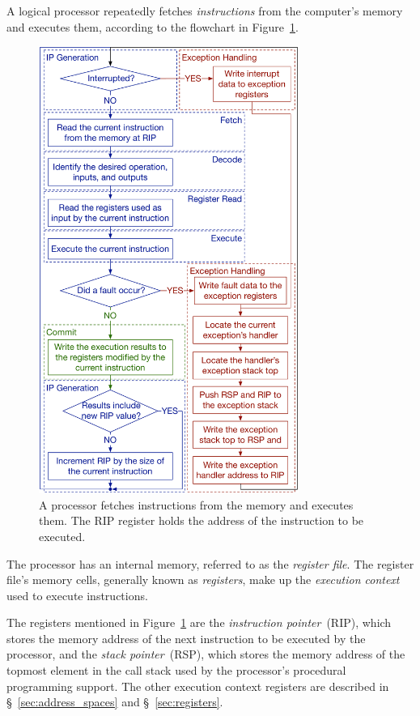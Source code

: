 A logical processor repeatedly fetches \textit{instructions} from the
computer's memory and executes them, according to the flowchart in
Figure~\ref{fig:processor_execution}.

\begin{figure}[hbt]
  \centering
  \includegraphics[width=85mm]{figures/processor_execution.pdf}
  \caption{
    A processor fetches instructions from the memory and executes them. The RIP
    register holds the address of the instruction to be executed.
  }
  \label{fig:processor_execution}
\end{figure}

The processor has an internal memory, referred to as the
\textit{register file}. The register file's memory cells, generally known as
\textit{registers}, make up the \textit{execution context} used to execute
instructions.

The registers mentioned in Figure~\ref{fig:processor_execution} are the
\textit{instruction pointer}~(RIP), which stores the memory  address of the
next instruction to be executed by the processor, and the
\textit{stack pointer}~(RSP), which stores the memory address of the topmost
element in the call stack used by the processor's procedural programming
support. The other execution context registers are described in
\S~\ref{sec:address_spaces} and \S~\ref{sec:registers}.

